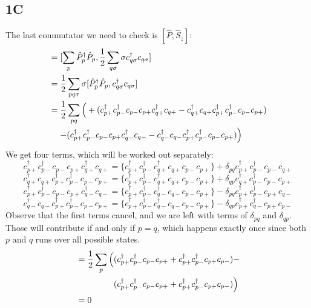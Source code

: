\documentclass[norsk,a4paper,12pt]{article}
\begin{document}
\subsection*{1C}
The last commutator we need to check is $[\hat{P},\hat{S}_z]$:
\begin{align}
[\hat{P},\hat{S}_z]&=[\sum_p\hat{P}_p^{\dagger}\hat{P}_p,\frac{1}{2}\sum_{q\sigma}\sigma c_{q\sigma}^{\dagger}c_{q\sigma}]\notag\\
&=\frac{1}{2}\sum_{pq\sigma}\sigma[\hat{P}_p^{\dagger}\hat{P}_p,c_{q\sigma}^{\dagger}c_{q\sigma}]\notag\\
&=\frac{1}{2}\sum_{pq}\Big(+(c_{p+}^{\dagger}c_{p-}^{\dagger}c_{p-}c_{p+}c_{q+}^{\dagger}c_{q+}-c_{q+}^{\dagger}c_{q+}c_{p+}^{\dagger}c_{p-}^{\dagger}c_{p-}c_{p+})\notag\\
&\mathrel{\phantom{=}}-(c_{p+}^{\dagger}c_{p-}^{\dagger}c_{p-}c_{p+}c_{q-}^{\dagger}c_{q-}-c_{q-}^{\dagger}c_{q-}c_{p+}^{\dagger}c_{p-}^{\dagger}c_{p-}c_{p+})\Big)
\end{align}
We get four terms, which will be worked out separately:
\begin{equation}
c_{p+}^{\dagger}c_{p-}^{\dagger}c_{p-}c_{p+}c_{q+}^{\dagger}c_{q+} = \{c_{p+}^{\dagger}c_{p-}^{\dagger}c_{q+}^{\dagger}c_{q+}c_{p-}c_{p+}\}+\delta_{pq}c_{p+}^{\dagger}c_{p-}^{\dagger}c_{p-}c_{q+}
\end{equation}
\begin{equation}
c_{q+}^{\dagger}c_{q+}c_{p+}^{\dagger}c_{p-}^{\dagger}c_{p-}c_{p+} = \{c_{p+}^{\dagger}c_{p-}^{\dagger}c_{q+}^{\dagger}c_{q+}c_{p-}c_{p+}\}+\delta_{qp}c_{q+}^{\dagger}c_{p-}^{\dagger}c_{p-}c_{p+}
\end{equation}
\begin{equation}
c_{p+}^{\dagger}c_{p-}^{\dagger}c_{p-}c_{p+}c_{q-}^{\dagger}c_{q-} = \{c_{p+}^{\dagger}c_{p-}^{\dagger}c_{q-}^{\dagger}c_{q-}c_{p-}c_{p+}\}-\delta_{pq}c_{p+}^{\dagger}c_{p-}^{\dagger}c_{p+}c_{q-}
\end{equation}
\begin{equation}
c_{q-}^{\dagger}c_{q-}c_{p+}^{\dagger}c_{p-}^{\dagger}c_{p-}c_{p+} = \{c_{p+}^{\dagger}c_{p-}^{\dagger}c_{q-}^{\dagger}c_{q-}c_{p-}c_{p+}\}-\delta_{qp}c_{p+}^{\dagger}c_{q-}^{\dagger}c_{p+}c_{p-}
\end{equation}
Observe that the first terms cancel, and we are left with terms of $\delta_{pq}$ and $\delta_{qp}$. Those will contribute if and only if $p=q$, which happens exactly once since both $p$ and $q$ runs over all possible states. 
\begin{align}
[\hat{P}, \hat{S}_z]&= \begin{aligned}[t]
\frac{1}{2}\sum_p\Big(&(c_{p+}^{\dagger}c_{p-}^{\dagger}c_{p-}c_{p+}+c_{p+}^{\dagger}c_{p-}^{\dagger}c_{p+}c_{p-})-\notag\\
&(c_{p+}^{\dagger}c_{p-}^{\dagger}c_{p-}c_{p+}+c_{p+}^{\dagger}c_{p-}^{\dagger}c_{p+}c_{p-})\Big)
\end{aligned}\\
&=0
\end{align}
\end{document}
